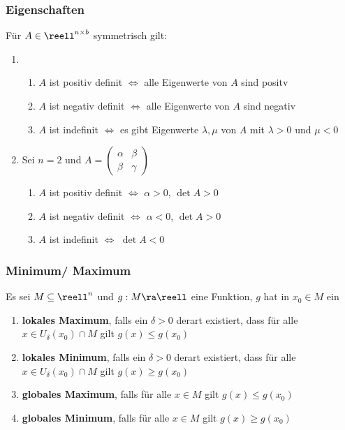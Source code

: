 \documentclass{kit}
\begin{document}
    \subsubsection{Eigenschaften}
      Für $A\in\reell^{n\times b}$ symmetrisch gilt:
      \begin{enumerate}
        \item \begin{enumerate}[label=\roman*)]
            \item $A$ ist positiv definit $\Longleftrightarrow$ alle Eigenwerte von $A$ sind positv   
            \item $A$ ist negativ definit $\Longleftrightarrow$ alle Eigenwerte von $A$ sind negativ
            \item $A$ ist indefinit $\Longleftrightarrow$ es gibt Eigenwerte $\lambda,\mu$ von $A$ mit $\lambda>0$ und 
              $\mu<0$
          \end{enumerate}
        \item Sei $n=2$ und $A=\begin{pmatrix}
            \alpha & \beta\\
            \beta & \gamma
          \end{pmatrix}$
          \begin{enumerate}[label=\roman*)]
            \item $A$ ist positiv definit $\Longleftrightarrow$ $\alpha>0$, $\det A>0$
            \item $A$ ist negativ definit $\Longleftrightarrow$ $\alpha<0$, $\det A>0$
            \item $A$ ist indefinit $\Longleftrightarrow$ $\det A<0$
          \end{enumerate}
      \end{enumerate}
    \subsubsection{Minimum/ Maximum}
      Es sei $M\subseteq\reell^n$ und $g:M\ra\reell$ eine Funktion, $g$ hat in $x_0\in M$ ein
      \begin{enumerate}
        \item \textbf{lokales Maximum}, falls ein $\delta>0$ derart existiert, dass für alle $x\in U_\delta(x_0)\cap M$ gilt
            $g(x)\le g(x_0)$
        \item \textbf{lokales Minimum}, falls ein $\delta>0$ derart existiert, dass für alle $x\in U_\delta(x_0)\cap M$ gilt
            $g(x)\ge g(x_0)$     
        \item \textbf{globales Maximum}, falls für alle $x\in M$ gilt $g(x)\le g(x_0)$
        \item \textbf{globales Minimum}, falls für alle $x\in M$ gilt $g(x)\ge g(x_0)$
      \end{enumerate}
\end{document}
